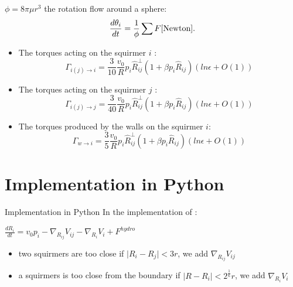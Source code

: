 \documentclass{beamer}
\begin{document}
\begin{frame}
    $\phi = 8\pi\mu r^3$ the rotation flow around a sphere\cite{Stokes}:
$$\frac{d \theta_i}{dt} = \frac{1}{\phi}\sum F\cite{Newton}.$$
    \begin{itemize}
        \item The torques acting on the squirmer $i$ :
        \begin{equation*}
        \boxed{\Gamma_{i(j)\rightarrow i} = \frac{3}{10}\frac{v_0}{R}p_i\hat{R}_{ij}^{\perp}(1 + \beta p_i\hat{R}_{ij})(ln \epsilon + O(1))}
    \end{equation*}
        \item The torques acting on the squirmer $j$ :
        \begin{equation*}
        \boxed{\Gamma_{i(j)\rightarrow j} = \frac{3}{40}\frac{v_0}{R}p_i\hat{R}_{ij}^{\perp}(1 + \beta p_i\hat{R}_{ij})(ln \epsilon + O(1))}
    \end{equation*}
        \item The torques produced by the walls on the squirmer $i$:
        \begin{equation*}
            \boxed{\Gamma_{w\rightarrow i} = \frac{3}{5} \frac{v_0}{R}p_i\hat{R}_{ij}^{\perp}(1 + \beta p_i\hat{R}_{ij})(ln \epsilon + O(1))}
        \end{equation*}
    \end{itemize}
        
\end{frame}

\section{Implementation in Python}
\begin{frame}{Implementation in Python}
In the implementation of : \begin{center}
        \(\boxed{\frac{dR_i}{dt} = v_0 p_i -  \nabla_{R_{ij}} V_{ij} - \nabla_{R_i} V_i + F^{hydro}}\)
\end{center}
\begin{itemize}
    \item two squirmers are too close if $\lvert R_i-R_j\rvert < 3r$, we add $\nabla_{R_{ij}}V_{ij}$
    \item a squirmers is too close from the boundary if $\lvert R-R_i\rvert < 2^{\frac{1}{6}}r$, we add $\nabla_{R_{i}}V_{i}$
\end{itemize}
\end{frame}
\end{document}
